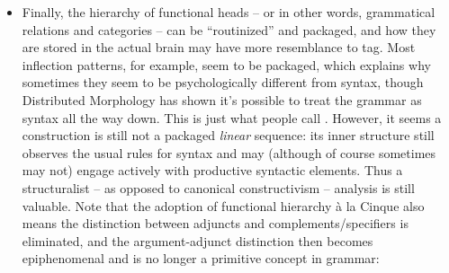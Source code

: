 {\begin{itemize}
        The exact meaning of ``directly reflect'' however is rather hard to tell 
        from an empirical perspective.
        What we already know is that
        quantitative researches suggest that 
        at least a semi-configurational approach 
        (i.e. a linear template with fixed constituent slots in it)
        is needed to fully capture Latin constituent order, 
        because the diachronic change of the frequency of OVAux
        looks very different from the diachronic change of the overall OV frequency,
        which includes, say, OAuxV \citep{danckaert2015studying}.
        But after we accept the semi-configurational approach, 
        we can then do tests like, say, Principles A, B, and C, 
        coordination and ellipsis tests, etc.,
        on slots of these templates, 
        and usually a hierarchy of 
        relative ``strength '' of dependency relations
        can be established 
        \citep[]{danckaert2017development}.
        Then, by the duality between constituency and dependency, 
        usually we will find 
        that a constituency-based analysis is \emph{accurate} for 
        a so-called non-configurational language, 
        although it may not be \emph{convenient} 
        for its documentation.
    \item Finally, the hierarchy of functional heads -- or in other words, 
        grammatical relations and categories -- 
        can be ``routinized'' and packaged,
        and how they are stored in the actual brain 
        may have more resemblance to \ac{tag}. 
        Most inflection patterns, for example, 
        seem to be packaged, 
        which explains why sometimes they seem to be psychologically different from syntax, 
        though Distributed Morphology has shown it's possible to treat the grammar 
        as syntax all the way down. 
        This is just what people call .
        However, it seems a construction is still not a packaged \emph{linear} sequence: 
        its inner structure still observes the usual rules for syntax 
        and may (although of course sometimes may not) engage 
        actively with productive syntactic elements. 
        Thus a structuralist -- as opposed to canonical constructivism -- 
        analysis is still valuable.
        Note that the adoption of functional hierarchy à la Cinque 
        also means the distinction between adjuncts and complements/specifiers 
        is eliminated, 
        and the argument-adjunct distinction then becomes epiphenomenal 
        and is no longer a primitive concept in grammar:

\end{itemize}}
